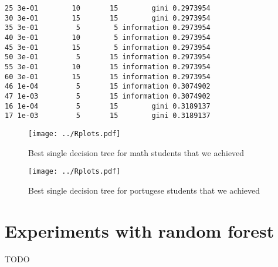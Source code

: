 \documentclass[a4paper]{article}
\begin{document}
\begin{verbatim}
25 3e-01        10       15        gini 0.2973954
30 3e-01        15       15        gini 0.2973954
35 3e-01         5        5 information 0.2973954
40 3e-01        10        5 information 0.2973954
45 3e-01        15        5 information 0.2973954
50 3e-01         5       15 information 0.2973954
55 3e-01        10       15 information 0.2973954
60 3e-01        15       15 information 0.2973954
46 1e-04         5       15 information 0.3074902
47 1e-03         5       15 information 0.3074902
16 1e-04         5       15        gini 0.3189137
17 1e-03         5       15        gini 0.3189137
\end{verbatim}




\begin{figure}[]
    \caption[]{Best single decision tree for math students that we achieved}
    \centering
    \texttt{[image: ../Rplots.pdf]}
    \label{fig:single1}
\end{figure}

\begin{figure}[]
    \caption[]{Best single decision tree for portugese students that we achieved}
    \centering
    \texttt{[image: ../Rplots.pdf]}
    \label{fig:single2}
\end{figure}

\newpage
\section{Experiments with random forest}
TODO
\end{document}
